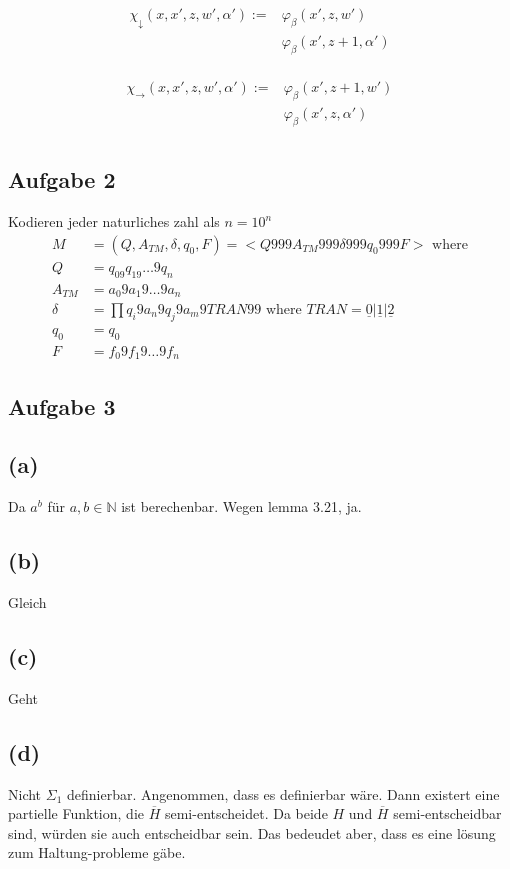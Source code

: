 \documentclass[12pt]{article}
\begin{document}
\begin{align*}
  \chi_{\downarrow}(x,x',z,w',\alpha') := &\varphi_\beta(x', z, w') \\
  &\varphi_\beta(x',z+1,\alpha') \\
\end{align*}

\begin{align*}
  \chi_{\rightarrow}(x,x',z,w',\alpha') := &\varphi_\beta(x', z+1, w') \\
  &\varphi_\beta(x',z,\alpha') \\
\end{align*}
\subsection*{Aufgabe 2}
  Kodieren jeder naturliches zahl als $n = 10^n$\\
\begin{equation}
  \begin{split}
  M &= (Q, A_{TM}, \delta, q_0, F) = <Q999A_{TM}999\delta 999 q_0 999 F > \mbox{ where} \\
  Q &= q_09q_19\dots 9 q_n\\
  A_{TM} &= a_0 9 a_1 9 \dots 9 a_n \\
  \delta &=  \prod q_i9a_n9q_j9a_m9TRAN 99 \mbox{ where } TRAN = \underline 0 | \underline 1 | \underline 2\\
  q_0 &= q_0 \\
  F &= f_0 9 f_1 9 \dots 9 f_n
  \end{split}
  \end{equation}
\subsection*{Aufgabe 3}
\subsection*{(a)}
Da $a^b$ für $a,b \in \mathbb{N}$ ist berechenbar. Wegen lemma 3.21, ja.
\subsection*{(b)}
Gleich
\subsection*{(c)}
Geht
\subsection*{(d)}
Nicht $\Sigma_1$ definierbar. Angenommen, dass es definierbar wäre. Dann existert eine partielle Funktion, die $\overline H$ semi-entscheidet. Da beide $H$ und $\overline H$ semi-entscheidbar sind, würden sie auch entscheidbar sein. Das bedeudet aber, dass es eine lösung zum Haltung-probleme gäbe.
\end{document}
